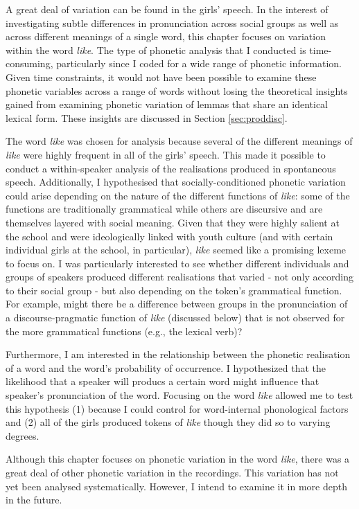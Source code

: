 \noindent A great deal of variation can be found in the girls' speech.  In the interest of investigating subtle differences in pronunciation across social groups as well as across different meanings of a single word, this chapter focuses on variation within the word \textit{like}.  The type of phonetic analysis that I conducted is time-consuming, particularly since I coded for a wide range of phonetic information.  Given time constraints, it would not have been possible to examine these phonetic variables across a range of words without losing the theoretical insights gained from examining phonetic variation of lemmas that share an identical lexical form.  These insights are discussed in Section \ref{sec:proddisc}.

The word \textit{like} was chosen for analysis because several of the different meanings of \textit{like} were highly frequent in all of the girls' speech.  This made it possible to conduct a within-speaker analysis of the realisations produced in spontaneous speech.  Additionally, I hypothesised that socially-conditioned phonetic variation could arise depending on the nature of the different functions of \textit{like}: some of the functions are traditionally grammatical while others are discursive and are themselves layered with social meaning. Given that they were highly salient at the school and were ideologically linked with youth culture (and with certain individual girls at the school, in particular), \textit{like} seemed like a promising lexeme to focus on.  I was particularly interested to see whether different individuals and groups of speakers produced different realisations that varied - not only according to their social group - but also depending on the token's grammatical function.  For example, might there be a difference between groups in the pronunciation of a discourse-pragmatic function of \textit{like} (discussed below) that is not observed for the more grammatical functions (e.g., the lexical verb)?  

Furthermore, I am interested in the relationship between the phonetic realisation of a word and the word's probability of occurrence. I hypothesized that the likelihood that a speaker will producs a certain word might influence that speaker's pronunciation of the word.  Focusing on the word \textit{like} allowed me to test this hypothesis (1) because I could control for word-internal phonological factors and (2) all of the girls produced tokens of \textit{like} though they did so to varying degrees.

Although this chapter focuses on phonetic variation in the word \textit{like}, there was a great deal of other phonetic variation in the recordings.  This variation has not yet been analysed systematically.  However, I intend to examine it in more depth in the future.  

